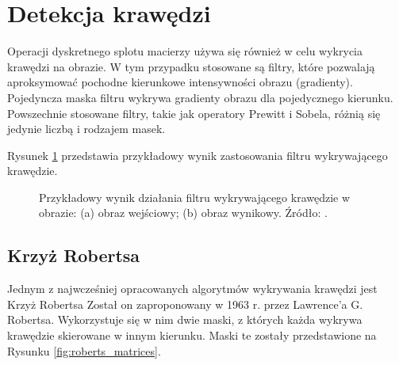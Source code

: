 \documentclass[a4paper,twocolumn,12pt]{article}
\begin{document}
\section{Detekcja krawędzi}

Operacji dyskretnego splotu macierzy używa się również w celu wykrycia krawędzi na obrazie.
W tym przypadku stosowane są filtry, które pozwalają aproksymować pochodne kierunkowe intensywności obrazu (gradienty).
Pojedyncza maska filtru wykrywa gradienty obrazu dla pojedycznego kierunku.
Powszechnie stosowane filtry, takie jak operatory Prewitt i Sobela, różnią się jedynie liczbą i rodzajem masek.

Rysunek \ref{fig:edges_example} przedstawia przykładowy wynik zastosowania filtru wykrywającego krawędzie.

\begin{figure}[!ht]
 \begin{center}
 \end{center}
 \caption{
  Przykładowy wynik działania filtru wykrywającego krawędzie w obrazie:
  (a) obraz wejściowy;
  (b) obraz wynikowy.
  Źródło: \cite{roberts}.
 }
 \label{fig:edges_example}
\end{figure}


\subsection{Krzyż Robertsa}

Jednym z najwcześniej opracowanych algorytmów wykrywania krawędzi jest Krzyż Robertsa
Został on zaproponowany w 1963 r. przez Lawrence’a G. Robertsa.
Wykorzystuje się w nim dwie maski, z których każda wykrywa krawędzie skierowane w innym kierunku.
Maski te zostały przedstawione na Rysunku \ref{fig:roberts_matrices}.
\end{document}

